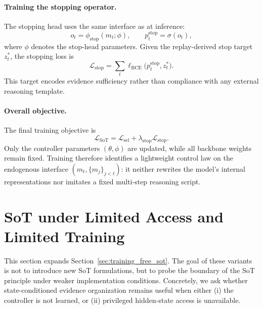 \paragraph{Training the stopping operator.}
The stopping head uses the same interface as at inference:
\begin{equation}
o_t=\phi_{\mathrm{stop}}(m_t;\phi), \qquad
p_t^{\mathrm{stop}}=\sigma(o_t),
\label{eq:app_stop_score}
\end{equation}
where \(\phi\) denotes the stop-head parameters. 
Given the replay-derived stop target \(z_t^{*}\), the stopping loss is
\begin{equation}
\mathcal{L}_{\mathrm{stop}}
=
\sum_t
\ell_{\mathrm{BCE}}\!\bigl(p_t^{\mathrm{stop}}, z_t^{*}\bigr).
\label{eq:app_stop_loss}
\end{equation}
This target encodes evidence sufficiency rather than compliance with any external reasoning template.

\paragraph{Overall objective.}
The final training objective is
\begin{equation}
\mathcal{L}_{\mathrm{SoT}}
=
\mathcal{L}_{\mathrm{sel}}
+\lambda_{\mathrm{stop}}\mathcal{L}_{\mathrm{stop}}.
\label{eq:app_total_loss}
\end{equation}
Only the controller parameters \((\theta,\phi)\) are updated, while all backbone weights remain fixed. 
Training therefore identifies a lightweight control law on the endogenous interface \((m_t,\{m_j\}_{j<t})\): it neither rewrites the model's internal representations nor imitates a fixed multi-step reasoning script.

\section{SoT under Limited Access and Limited Training}
\label{app:limitations_sot}

This section expands Section~\ref{sec:training_free_sot}. 
The goal of these variants is not to introduce new SoT formulations, but to probe the boundary of the SoT principle under weaker implementation conditions. 
Concretely, we ask whether state-conditioned evidence organization remains useful when either (i) the controller is not learned, or (ii) privileged hidden-state access is unavailable.

